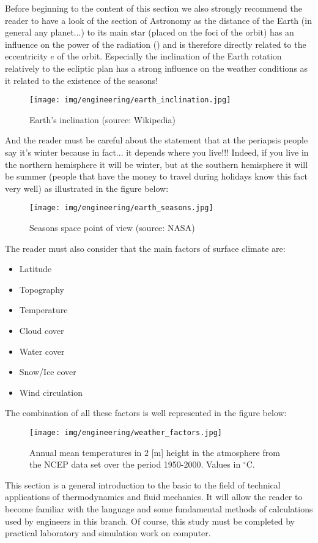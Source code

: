 	Before beginning to the content of this section we also strongly recommend the reader to have a look of the section of Astronomy as the distance of the Earth (in general any planet...) to its main star (placed on the foci of the orbit) has an influence on the power of the radiation () and is therefore directly related to the eccentricity $e$ of the orbit. Especially the inclination of the Earth rotation relatively to the ecliptic plan has a strong influence on the weather conditions as it related to the existence of the seasons!
	\begin{figure}[H]
		\centering
		\texttt{[image: img/engineering/earth\_inclination.jpg]}
		\caption[Earth's inclination]{Earth's inclination (source: Wikipedia)}
	\end{figure}
	And the reader must be careful about the statement that at the periapsis people say it's winter because in fact... it depends where you live!!! Indeed, if you live in the northern hemisphere it will be winter, but at the southern hemisphere it will be summer (people that have the money to travel during holidays know this fact very well) as illustrated in the figure below:
	\begin{figure}[H]
		\centering
		\texttt{[image: img/engineering/earth\_seasons.jpg]}
		\caption[Seasons space point of view]{Seasons space point of view (source: NASA)}
	\end{figure}
	The reader must also consider that the main factors of surface climate are:
	\begin{itemize}
		\item Latitude
		\item Topography
		\item Temperature
		\item Cloud cover
		\item Water cover
		\item Snow/Ice cover
		\item Wind circulation
	\end{itemize}
	The combination of all these factors is well represented in the figure below:
	\begin{figure}[H]
		\centering
		\texttt{[image: img/engineering/weather\_factors.jpg]}
		\caption{Annual mean temperatures in $2$ [m] height in the atmosphere from the NCEP data set over the period 1950-2000. Values in $^\circ$C.}
	\end{figure}
	This section is a general introduction to the basic to the field of technical applications of thermodynamics and fluid mechanics. It will allow the reader to become familiar with the language and some fundamental methods of calculations used by engineers in this branch. Of course, this study must be completed by practical laboratory and simulation work on computer.
	
